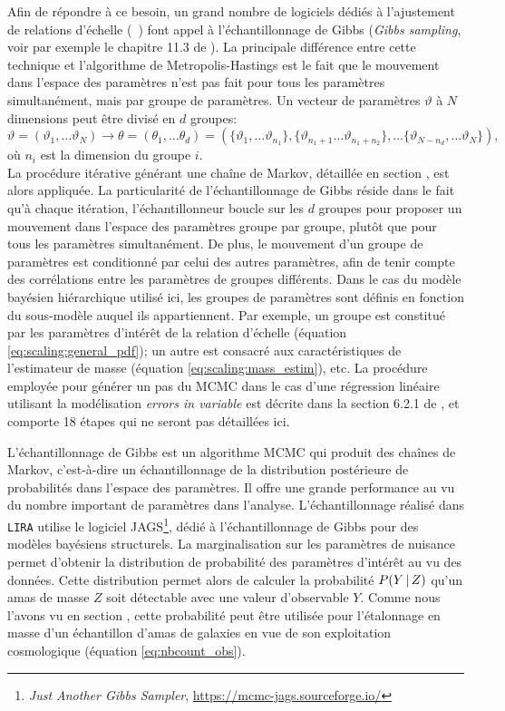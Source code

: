 Afin de répondre à ce besoin, un grand nombre de logiciels dédiés à l'ajustement de relations d'échelle (\eg\ \cite{sereno_bayesian_2016, mantz_gibbs_2016}) font appel à l'échantillonnage de Gibbs (\textit{Gibbs sampling}, voir par exemple le chapitre 11.3 de \cite{gelman_bayesian_2013}).
La principale différence entre cette technique et l'algorithme de Metropolis-Hastings est le fait que le mouvement dans l'espace des paramètres n'est pas fait pour tous les paramètres simultanément, mais par groupe de paramètres.
Un vecteur de paramètres $\vartheta$ à $N$ dimensions peut être divisé en $d$ groupes:
\begin{equation}
    \vartheta = (\vartheta_1, \dots \vartheta_N)
    \rightarrow \theta = (\theta_1, \dots \theta_d)
    = (\{\vartheta_1, \dots \vartheta_{n_1}\}, \{\vartheta_{n_1 + 1} \dots \vartheta_{n_1 + n_2}\}, \dots \{\vartheta_{N - n_d}, \dots \vartheta_N\}),
\end{equation}
où $n_i$ est la dimension du groupe $i$. \\
La procédure itérative générant une chaîne de Markov, détaillée en section , est alors appliquée.
La particularité de l'échantillonnage de Gibbs réside dans le fait qu'à chaque itération, l'échantillonneur boucle sur les $d$ groupes pour proposer un mouvement dans l'espace des paramètres groupe par groupe, plutôt que pour tous les paramètres simultanément.
De plus, le mouvement d'un groupe de paramètres est conditionné par celui des autres paramètres, afin de tenir compte des corrélations entre les paramètres de groupes différents.
Dans le cas du modèle bayésien hiérarchique utilisé ici, les groupes de paramètres sont définis en fonction du sous-modèle auquel ils appartiennent.
Par exemple, un groupe est constitué par les paramètres d'intérêt de la relation d'échelle (équation \ref{eq:scaling:general_pdf}); un autre est consacré aux caractéristiques de l'estimateur de masse (équation \ref{eq:scaling:mass_estim}), etc.
La procédure employée pour générer un pas du MCMC dans le cas d'une régression linéaire utilisant la modélisation \textit{errors in variable} est décrite dans la section 6.2.1 de \cite{kelly_aspects_2007}, et comporte 18 étapes qui ne seront pas détaillées ici.

L'échantillonnage de Gibbs est un algorithme MCMC qui produit des chaînes de Markov, c'est-à-dire un échantillonnage de la distribution postérieure de probabilités dans l'espace des paramètres.
Il offre une grande performance au vu du nombre important de paramètres dans l'analyse.
L'échantillonnage réalisé dans \texttt{LIRA} utilise le logiciel JAGS\footnote{\textit{Just Another Gibbs Sampler}, \url{https://mcmc-jags.sourceforge.io/}}, dédié à l'échantillonnage de Gibbs pour des modèles bayésiens structurels.
La marginalisation sur les paramètres de nuisance permet d'obtenir la distribution de probabilité des paramètres d'intérêt au vu des données.
Cette distribution permet alors de calculer la probabilité $P({Y\,|\,Z})$ qu'un amas de masse $Z$ soit détectable avec une valeur d'observable $Y$.
Comme nous l'avons vu en section , cette probabilité peut être utilisée pour l'étalonnage en masse d'un échantillon d'amas de galaxies en vue de son exploitation cosmologique (équation \ref{eq:nbcount_obs}).

